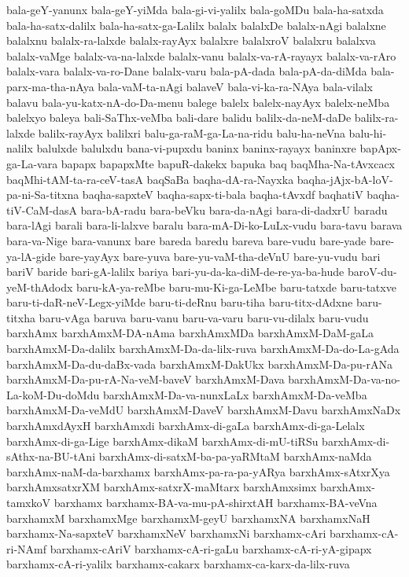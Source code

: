 {bala-geY-yanunx
bala-geY-yiMda
bala-gi-vi-yalilx
bala-goMDu
bala-ha-satxda
bala-ha-satx-dalilx
bala-ha-satx-ga-Lalilx
balalx
balalxDe
balalx-nAgi
balalxne
balalxnu
balalx-ra-lalxde
balalx-rayAyx
balalxre
balalxroV
balalxru
balalxva
balalx-vaMge
balalx-va-na-lalxde
balalx-vanu
balalx-va-rA-rayayx
balalx-va-rAro
balalx-vara
balalx-va-ro-Dane
balalx-varu
bala-pA-dada
bala-pA-da-diMda
bala-parx-ma-tha-nAya
bala-vaM-ta-nAgi
balaveV
bala-vi-ka-ra-NAya
bala-vilalx
balavu
bala-yu-katx-nA-do-Da-menu
balege
balelx
balelx-nayAyx
balelx-neMba
balelxyo
baleya
bali-SaThx-veMba
bali-dare
balidu
balilx-da-neM-daDe
balilx-ra-lalxde
balilx-rayAyx
balilxri
balu-ga-raM-ga-La-na-ridu
balu-ha-neVna
balu-hi-nalilx
balulxde
balulxdu
bana-vi-pupxdu
baninx
baninx-rayayx
baninxre
bapApx-ga-La-vara
bapapx
bapapxMte
bapuR-dakekx
bapuka
baq
baqMha-Na-tAvxcacx
baqMhi-tAM-ta-ra-ceV-tasA
baqSaBa
baqha-dA-ra-Nayxka
baqha-jAjx-bA-loV-pa-ni-Sa-titxna
baqha-sapxteV
baqha-sapx-ti-bala
baqha-tAvxdf
baqhatiV
baqha-tiV-CaM-dasA
bara-bA-radu
bara-beVku
bara-da-nAgi
bara-di-dadxrU
baradu
bara-lAgi
barali
bara-li-lalxve
baralu
bara-mA-Di-ko-LuLx-vudu
bara-tavu
barava
bara-va-Nige
bara-vanunx
bare
bareda
baredu
bareva
bare-vudu
bare-yade
bare-ya-lA-gide
bare-yayAyx
bare-yuva
bare-yu-vaM-tha-deVnU
bare-yu-vudu
bari
bariV
baride
bari-gA-lalilx
bariya
bari-yu-da-ka-diM-de-re-ya-ba-hude
baroV-du-yeM-thAdodx
baru-kA-ya-reMbe
baru-mu-Ki-ga-LeMbe
baru-tatxde
baru-tatxve
baru-ti-daR-neV-Legx-yiMde
baru-ti-deRnu
baru-tiha
baru-titx-dAdxne
baru-titxha
baru-vAga
baruva
baru-vanu
baru-va-varu
baru-vu-dilalx
baru-vudu
barxhAmx
barxhAmxM-DA-nAma
barxhAmxMDa
barxhAmxM-DaM-gaLa
barxhAmxM-Da-dalilx
barxhAmxM-Da-da-lilx-ruva
barxhAmxM-Da-do-La-gAda
barxhAmxM-Da-du-daBx-vada
barxhAmxM-DakUkx
barxhAmxM-Da-pu-rANa
barxhAmxM-Da-pu-rA-Na-veM-baveV
barxhAmxM-Dava
barxhAmxM-Da-va-no-La-koM-Du-doMdu
barxhAmxM-Da-va-nunxLaLx
barxhAmxM-Da-veMba
barxhAmxM-Da-veMdU
barxhAmxM-DaveV
barxhAmxM-Davu
barxhAmxNaDx
barxhAmxdAyxH
barxhAmxdi
barxhAmx-di-gaLa
barxhAmx-di-ga-Lelalx
barxhAmx-di-ga-Lige
barxhAmx-dikaM
barxhAmx-di-mU-tiRSu
barxhAmx-di-sAthx-na-BU-tAni
barxhAmx-di-satxM-ba-pa-yaRMtaM
barxhAmx-naMda
barxhAmx-naM-da-barxhamx
barxhAmx-pa-ra-pa-yARya
barxhAmx-sAtxrXya
barxhAmxsatxrXM
barxhAmx-satxrX-maMtarx
barxhAmxsimx
barxhAmx-tamxkoV
barxhamx
barxhamx-BA-va-mu-pA-shirxtAH
barxhamx-BA-veVna
barxhamxM
barxhamxMge
barxhamxM-geyU
barxhamxNA
barxhamxNaH
barxhamx-Na-sapxteV
barxhamxNeV
barxhamxNi
barxhamx-cAri
barxhamx-cA-ri-NAmf
barxhamx-cAriV
barxhamx-cA-ri-gaLu
barxhamx-cA-ri-yA-gipapx
barxhamx-cA-ri-yalilx
barxhamx-cakarx
barxhamx-ca-karx-da-lilx-ruva
}
